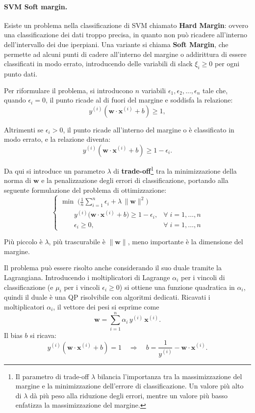 \paragraph{SVM Soft margin.} Esiste un problema nella classificazione di SVM chiamato \textbf{Hard Margin}: ovvero una classificazione dei dati troppo precisa, in quanto non può ricadere all'interno dell'intervallo dei due iperpiani. Una variante si chiama \textbf{Soft Margin}, che permette ad alcuni punti di cadere all'interno del margine o addirittura di essere classificati in modo errato, introducendo delle variabili di slack $\xi_i\ge 0$ per ogni punto dati. 

Per riformulare il problema, si introducono $n$ variabili $\epsilon_1, \epsilon_2, ..., \epsilon_n$ tale che, quando $\epsilon_i = 0$, il punto ricade al di fuori del margine e soddisfa la relazione:
\[
y^{(i)}(\mathbf{w}\cdot\mathbf{x}^{(i)}+b)\ge 1,
\]

\noindent
Altrimenti se $\epsilon_i > 0$, il punto ricade all'interno del margine o è classificato in modo errato, e la relazione diventa:
\[
y^{(i)}(\mathbf{w}\cdot\mathbf{x}^{(i)}+b)\ge 1 - \epsilon_i.
\]

Da qui si introduce un parametro $\lambda$ di \textbf{trade-off}\footnote{Il parametro di trade-off $\lambda$ bilancia l'importanza tra la massimizzazione del margine e la minimizzazione dell'errore di classificazione. Un valore più alto di $\lambda$ dà più peso alla riduzione degli errori, mentre un valore più basso enfatizza la massimizzazione del margine.} tra la minimizzazione della norma di $\mathbf{w}$ e la penalizzazione degli errori di classificazione, portando alla seguente formulazione del problema di ottimizzazione:
\[
\begin{cases}
\displaystyle\min\;\biggl(\frac{1}{n}\sum_{i=1}^n\epsilon_i + \lambda\,\|\mathbf{w}\|^2\biggr)\\[6pt]
\qquad y^{(i)}\bigl(\mathbf{w}\cdot\mathbf{x}^{(i)}+b\bigr)\ge 1-\epsilon_i, & \forall\; i=1,\dots,n\\[4pt]
\qquad \epsilon_i\ge 0, & \forall\; i=1,\dots,n
\end{cases}
\]

\noindent
Più piccolo è $\lambda$, più trascurabile è $\|\mathbf{w}\|$, meno importante è la dimensione del margine.

Il problema può essere risolto anche considerando il suo duale tramite la Lagrangiana. Introducendo i moltiplicatori di Lagrange $\alpha_i$ per i vincoli di classificazione (e $\mu_i$ per i vincoli $\epsilon_i\ge0$) si ottiene una funzione quadratica in $\alpha_i$, quindi il duale è una QP risolvibile con algoritmi dedicati. Ricavati i moltiplicatori $\alpha_i$, il vettore dei pesi si esprime come
\[
\mathbf{w}=\sum_{i=1}^n \alpha_i\,y^{(i)}\,\mathbf{x}^{(i)}.
\]
Il bias $b$ si ricava:
\[
y^{(i)}(\mathbf{w}\cdot\mathbf{x}^{(i)}+b)=1 \quad\Longrightarrow\quad b=\frac{1}{y^{(i)}} - \mathbf{w}\cdot\mathbf{x}^{(i)}.
\]

